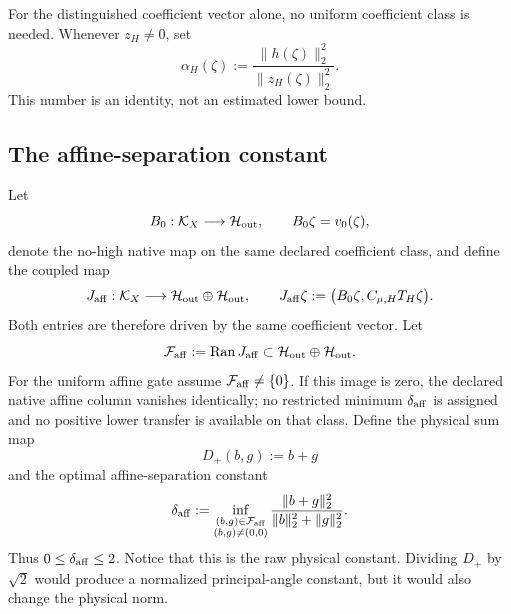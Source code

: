 For the distinguished coefficient vector alone, no uniform coefficient
class is needed.  Whenever \(z_H\ne0\), set
\begin{equation}
 \alpha_H(\zeta)
 :=\frac{\|h(\zeta)\|_2^2}{\|z_H(\zeta)\|_2^2}.
 \label{eq:tpc58-distinguished-alpha-H}
\end{equation}
This number is an identity, not an estimated lower bound.

\subsection{The affine-separation constant}

Let
\begin{equation}
 B_0:\mathcal K_X\longrightarrow\mathcal H_{\rm out},
 \qquad B_0\zeta=v_0(\zeta),
 \label{eq:tpc58-base-map}
\end{equation}
denote the no-high native map on the same declared coefficient class, and
define the coupled map
\begin{equation}
 J_{\rm aff}:\mathcal K_X
 \longrightarrow\mathcal H_{\rm out}\oplus\mathcal H_{\rm out},
 \qquad
 J_{\rm aff}\zeta
 :=\bigl(B_0\zeta,C_{\mu,H}T_H\zeta\bigr).
 \label{eq:tpc58-coupled-affine-map}
\end{equation}
Both entries are therefore driven by the same coefficient vector.  Let
\begin{equation}
 \mathcal F_{\rm aff}:=\operatorname{Ran} J_{\rm aff}
 \subset\mathcal H_{\rm out}\oplus\mathcal H_{\rm out}.
 \label{eq:tpc58-affine-pair-image}
\end{equation}
For the uniform affine gate assume \(\mathcal F_{\rm aff}\ne\{0\}\).  If this
image is zero, the declared native affine column vanishes identically; no
restricted minimum \(\delta_{\rm aff}\) is assigned and no positive lower
transfer is available on that class.
Define the physical sum map
\begin{equation}
 D_+(b,g):=b+g
 \label{eq:tpc58-affine-sum-map}
\end{equation}
and the optimal affine-separation constant
\begin{equation}
 \delta_{\rm aff}
 :=\inf_{\substack{(b,g)\in\mathcal F_{\rm aff}\\(b,g)\ne(0,0)}}
 \frac{\|b+g\|_2^2}{\|b\|_2^2+\|g\|_2^2}.
 \label{eq:tpc58-delta-aff}
\end{equation}
Thus \(0\le\delta_{\rm aff}\le2\).  Notice that this is the raw physical
constant.  Dividing \(D_+\) by \(\sqrt2\) would produce a normalized
principal-angle constant, but it would also change the physical norm.

